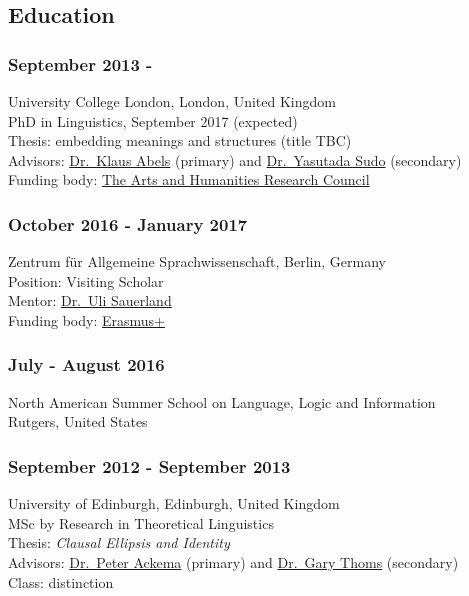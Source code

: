 \documentclass[]{article}
\begin{document}
\subsection{Education}\label{education}

\subsubsection{September 2013 -}\label{september-2013--}

University College London, London, United Kingdom\\
PhD in Linguistics, September 2017 (expected)\\
Thesis: embedding meanings and structures (title TBC)\\
Advisors:
\href{https://www.ucl.ac.uk/pals/people/profiles/academic-staff/klaus-abels}{Dr.~Klaus
Abels} (primary) and \href{https://www.ucl.ac.uk/~ucjtudo/}{Dr.~Yasutada
Sudo} (secondary)\\
Funding body: \href{http://www.ahrc.ac.uk/}{The Arts and Humanities
Research Council}

\subsubsection{October 2016 - January
2017}\label{october-2016---january-2017}

Zentrum für Allgemeine Sprachwissenschaft, Berlin, Germany\\
Position: Visiting Scholar\\
Mentor:
\href{http://www.zas.gwz-berlin.de/mitarbeiter_sauerland.html}{Dr.~Uli
Sauerland}\\
Funding body: \href{https://www.erasmusplus.org.uk/}{Erasmus+}

\subsubsection{July - August 2016}\label{july---august-2016}

North American Summer School on Language, Logic and Information\\
Rutgers, United States

\subsubsection{September 2012 - September
2013}\label{september-2012---september-2013}

University of Edinburgh, Edinburgh, United Kingdom\\
MSc by Research in Theoretical Linguistics\\
Thesis: \emph{Clausal Ellipsis and Identity}\\
Advisors: \href{http://www.lel.ed.ac.uk/~packema/}{Dr.~Peter Ackema}
(primary) and \href{https://sites.google.com/site/garythoms/}{Dr.~Gary
Thoms} (secondary)\\
Class: distinction
\end{document}
